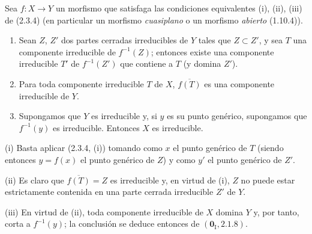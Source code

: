 \begin{corollary}[2.3.5]
\label{IV.2.3.5-fr}
Sea $f:X\to Y$ un morfismo que satisfaga las condiciones equivalentes \textup{(i),
(ii), (iii)} de \textup{(2.3.4) (en particular un morfismo \emph{cuasiplano} o un morfismo
\emph{abierto} (1.10.4))}.
\begin{enumerate}
  \item[\textup{(i)}] Sean $Z$, $Z'$ dos partes cerradas irreducibles de $Y$ tales que
  $Z\subset Z'$, y sea $T$ una componente irreducible de $f^{-1}(Z)$;
  entonces existe una componente irreducible $T'$ de $f^{-1}(Z')$ que contiene
  a $T$ (y domina $Z'$).
  \item[\textup{(ii)}] Para toda componente irreducible $T$ de $X$,
  $\overline{f(T)}$ es una componente irreducible de $Y$.
  \item[\textup{(iii)}] Supongamos que $Y$ es irreducible y, si $y$ es su punto
  genérico, supongamos que $f^{-1}(y)$ es irreducible. Entonces $X$ es irreducible.
\end{enumerate}
\end{corollary}

(i) Basta aplicar (2.3.4, (i)) tomando como $x$ el punto genérico
de $T$ (siendo entonces $y=f(x)$ el punto genérico de $Z$) y como $y'$ el
punto genérico de $Z'$.

(ii) Es claro que $\overline{f(T)}=Z$ es irreducible y, en virtud de (i),
$Z$ no puede estar estrictamente contenida en una parte cerrada irreducible
$Z'$ de $Y$.

(iii) En virtud de (ii), toda componente irreducible de $X$ domina $Y$ y, por
tanto, corta a $f^{-1}(y)$; la conclusión se deduce entonces de
$(\mathbf{0}_{\mathrm I},2.1.8)$.
